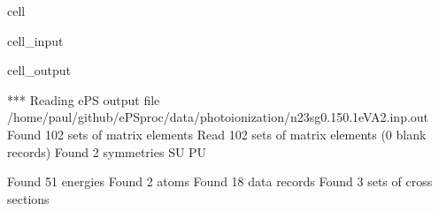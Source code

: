 \documentclass[letterpaper,10pt,english]{jupyterBook}
\begin{document}
\begin{sphinxuseclass}{cell}\begin{sphinxVerbatimInput}

\begin{sphinxuseclass}{cell_input}
\begin{sphinxVerbatim}[commandchars=\\\{\}]

\PYG{p}{[}\PYG{p}{]}

\end{sphinxVerbatim}

\end{sphinxuseclass}\end{sphinxVerbatimInput}
\begin{sphinxVerbatimOutput}

\begin{sphinxuseclass}{cell_output}
\begin{sphinxVerbatim}[commandchars=\\\{\}]
*** Reading ePS output file
/home/paul/github/ePSproc/data/photoionization/n2\PYGZus{}3sg\PYGZus{}0.1\PYGZhy{}50.1eV\PYGZus{}A2.inp.out
Found 102 sets of matrix elements
Read 102 sets of matrix elements (0 blank records)
Found 2 symmetries
    \PYGZsq{}SU\PYGZsq{}    \PYGZsq{}PU\PYGZsq{}

Found 51 energies
Found 2 atoms
Found 18 data records
Found 3 sets of cross sections
\end{sphinxVerbatim}

\end{sphinxuseclass}\end{sphinxVerbatimOutput}

\end{sphinxuseclass}
\end{document}
